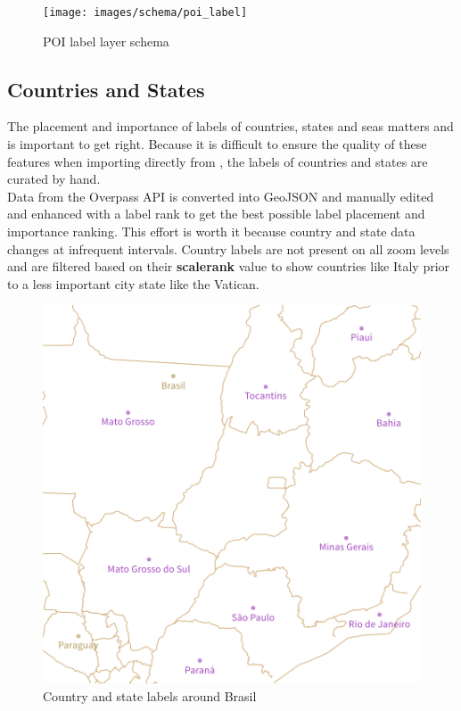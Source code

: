 \vspace{20pt}
\begin{figure}[h]
  \centering
  \texttt{[image: images/schema/poi\_label]}
  \caption{POI label layer schema}
\end{figure}

\subsection{Countries and States}

\noindent\begin{minipage}[t]{0.48\linewidth}
    \vspace{0pt}
    The placement and importance of labels of countries, states and seas matters\cite{12_axismaps.github.io_2015} and is important to get right. 
    Because it is difficult to ensure the quality of these features when importing directly from \osm{}, the labels of countries and states are curated by hand.\\
    Data from the Overpass API \cite{13_wiki.openstreetmap.org_2015} is converted into GeoJSON and manually edited and enhanced with a label rank to get the best possible label placement and importance ranking.
    This effort is worth it because country and state data changes
    at infrequent intervals.
    Country labels are not present on all zoom levels and are filtered based
    on their \textbf{scalerank} value to show countries like Italy prior to a less important city state like the Vatican.
\end{minipage}
\hfill
\begin{minipage}[t]{0.48\linewidth}
    \vspace{0pt}
    \begin{figure}[H]
        \includegraphics[width=\textwidth]{images/schema/country_state_label_example}
        \caption{Country and state labels around Brasil}
    \end{figure}
\end{minipage}

